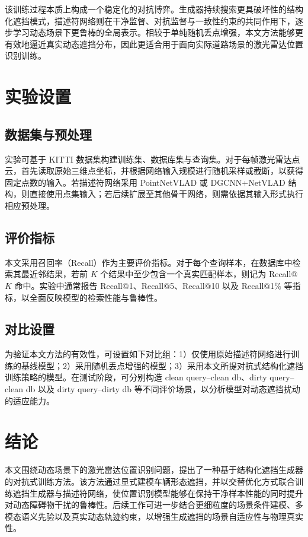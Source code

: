 \documentclass[UTF8,a4paper,12pt]{ctexart}
\begin{document}
该训练过程本质上构成一个稳定化的对抗博弈。生成器持续搜索更具破坏性的结构化遮挡模式，描述符网络则在干净监督、对抗监督与一致性约束的共同作用下，逐步学习动态场景下更鲁棒的全局表示。相较于单纯随机丢点增强，本文方法能够更有效地逼近真实动态遮挡分布，因此更适合用于面向实际道路场景的激光雷达位置识别训练。

\section{实验设置}
\subsection{数据集与预处理}
实验可基于 KITTI 数据集构建训练集、数据库集与查询集。对于每帧激光雷达点云，首先读取原始三维点坐标，并根据网络输入规模进行随机采样或截断，以获得固定点数的输入。若描述符网络采用 PointNetVLAD 或 DGCNN+NetVLAD 结构，则直接使用点集输入；若后续扩展至其他骨干网络，则需依据其输入形式执行相应预处理。

\subsection{评价指标}
本文采用召回率（Recall）作为主要评价指标。对于每个查询样本，在数据库中检索其最近邻结果，若前 $K$ 个结果中至少包含一个真实匹配样本，则记为 Recall@$K$ 命中。实验中通常报告 Recall@1、Recall@5、Recall@10 以及 Recall@1\% 等指标，以全面反映模型的检索性能与鲁棒性。

\subsection{对比设置}
为验证本文方法的有效性，可设置如下对比组：1）仅使用原始描述符网络进行训练的基线模型；2）采用随机丢点增强的模型；3）采用本文所提对抗式结构化遮挡训练策略的模型。在测试阶段，可分别构造 clean query--clean db、dirty query--clean db 以及 dirty query--dirty db 等不同评价场景，以分析模型对动态遮挡扰动的适应能力。

\section{结论}
本文围绕动态场景下的激光雷达位置识别问题，提出了一种基于结构化遮挡生成器的对抗式训练方法。该方法通过显式建模车辆形态遮挡，并以交替优化方式联合训练遮挡生成器与描述符网络，使位置识别模型能够在保持干净样本性能的同时提升对动态障碍物干扰的鲁棒性。后续工作可进一步结合更细粒度的场景条件建模、多模态语义先验以及真实动态轨迹约束，以增强生成遮挡的场景自适应性与物理真实性。
\end{document}
